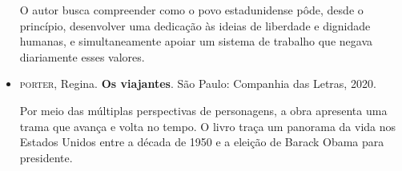 \documentclass[12pt]{extarticle}
\begin{document}
\begin{itemize}
O autor busca compreender como o povo estadunidense pôde, desde o
princípio, desenvolver uma dedicação às ideias de liberdade e dignidade
humanas, e simultaneamente apoiar um sistema de trabalho que negava
diariamente esses valores.

\item\textsc{porter}, Regina. \textbf{Os viajantes}. São Paulo: Companhia das
  Letras, 2020.

Por meio das múltiplas perspectivas de personagens, a obra apresenta uma
trama que avança e volta no tempo. O livro traça um panorama da vida nos
Estados Unidos entre a década de 1950 e a eleição de Barack Obama para
presidente.
\end{itemize}
\end{document}
